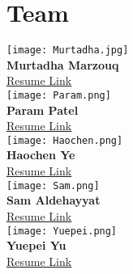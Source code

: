 \graphicspath{ {images} }

\section{Team}
    \texttt{[image: Murtadha.jpg]}\\ \textbf{Murtadha Marzouq}\\ \href{https://webpages.charlotte.edu/mmarzouq/English/Resume.pdf}{\underline{Resume Link}}\\
   \texttt{[image: Param.png]}\\ \textbf{Param Patel}\\  \href{https://drive.google.com/file/d/13jr45PMGy9iJG0CavpYmuiN5SDwGgygj/view?usp=sharing}{\underline{Resume Link}}\\
\texttt{[image: Haochen.png]}\\     \textbf{Haochen Ye}\\ \href{https://drive.google.com/file/d/1YOZvJANmngCAai1OxXm28a_7XmKGmpH1/view?usp=sharing}{\underline{Resume Link}}\\
\texttt{[image: Sam.png]}\\     \textbf{Sam Aldehayyat}\\ \href{https://drive.google.com/file/d/14jBT5AZ_GzdElLh-0LSXzP7AxgjMu0wa/view?usp=sharing}{\underline{Resume Link}}\\
\texttt{[image: Yuepei.png]}\\     \textbf{Yuepei Yu}\\ \href{https://drive.google.com/file/d/1xcBhl6kxY1gQZsCjADVlJvvDVYBJLoSo/view?usp=sharing}{\underline{Resume Link}}\\
